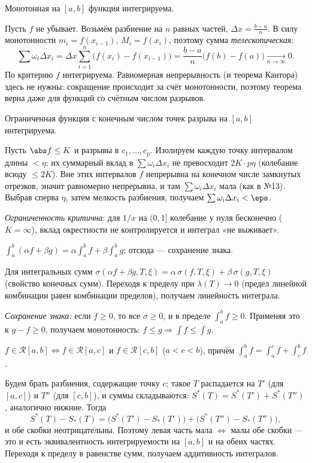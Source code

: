 \stmt Монотонная на $[a,b]$ функция интегрируема.

\dok Пусть $f$ не убывает. Возьмём разбиение на $n$ равных частей, $\Delta x=\tfrac{b-a}{n}$. В силу
монотонности $m_i=f(x_{i-1})$, $M_i=f(x_i)$, поэтому сумма \emph{телескопическая}:
\[
  \sum\omega_i\Delta x_i=\Delta x\sum_{i=1}^n\bigl(f(x_i)-f(x_{i-1})\bigr)
  =\frac{b-a}{n}\bigl(f(b)-f(a)\bigr)\xrightarrow[n\to\infty]{}0 .
\]
По критерию $f$ интегрируема. Равномерная непрерывность (и теорема Кантора) здесь не нужны:
сокращение происходит за счёт монотонности, поэтому теорема верна даже для функций со счётным
числом разрывов.

\stmt Ограниченная функция с конечным числом точек разрыва на $[a,b]$ интегрируема.

\dok Пусть $\abs f\le K$ и разрывы в $c_1,\dots,c_p$. Изолируем каждую точку интервалом длины $<\eta$;
их суммарный вклад в $\sum\omega_i\Delta x_i$ не превосходит $2K\cdot p\eta$ (колебание всюду
$\le2K$). Вне этих интервалов $f$ непрерывна на конечном числе замкнутых отрезков, значит
равномерно непрерывна, и там $\sum\omega_i\Delta x_i$ мала (как в №13). Выбрав сперва $\eta$, затем
мелкость разбиения, получаем $\sum\omega_i\Delta x_i<\eps$.

\emph{Ограниченность критична}: для
$1/x$ на $(0,1]$ колебание у нуля бесконечно ($K=\infty$), вклад окрестности не контролируется и
интеграл «не выживает».

\stmt $\int_a^b(\alpha f+\beta g)=\alpha\int_a^b f+\beta\int_a^b g$; отсюда — сохранение знака.

\dok Для интегральных сумм $\sigma(\alpha f+\beta g,T,\xi)=\alpha\,\sigma(f,T,\xi)+\beta\,\sigma(g,T,\xi)$
(свойство конечных сумм). Переходя к пределу при $\lambda(T)\to0$ (предел линейной комбинации равен
комбинации пределов), получаем линейность интеграла.

\emph{Сохранение знака:} если $f\ge0$, то все
$\sigma\ge0$, и в пределе $\int_a^b f\ge0$. Применяя это к $g-f\ge0$, получаем монотонность:
$f\le g\Rightarrow\int f\le\int g$.

\stmt $f\in\mathcal R[a,b]\iff f\in\mathcal R[a,c]$ и $f\in\mathcal R[c,b]$ ($a<c<b$), причём
$\int_a^b f=\int_a^c f+\int_c^b f$.

\dok Будем брать разбиения, содержащие точку $c$; такое $T$ распадается на $T'$ (для $[a,c]$) и
$T''$ (для $[c,b]$), и суммы складываются: $S^*(T)=S^*(T')+S^*(T'')$, аналогично нижние. Тогда
\[
  S^*(T)-S_*(T)=\bigl(S^*(T')-S_*(T')\bigr)+\bigl(S^*(T'')-S_*(T'')\bigr),
\]
и обе скобки неотрицательны. Поэтому левая часть мала $\iff$ малы обе скобки — это и есть
эквивалентность интегрируемости на $[a,b]$ и на обеих частях. Переходя к пределу в равенстве сумм,
получаем аддитивность интегралов.

